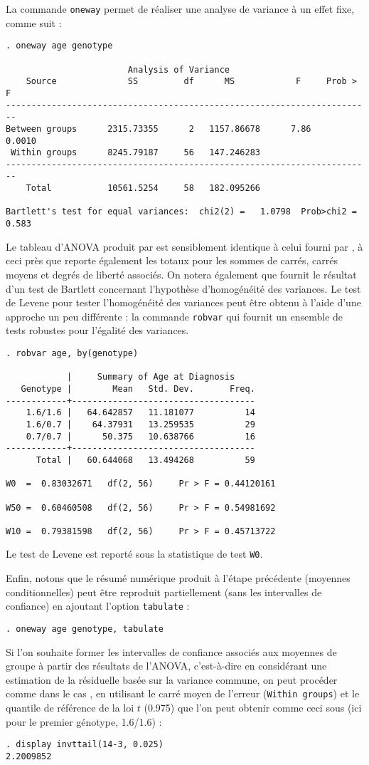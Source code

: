 La commande \texttt{oneway} permet de réaliser une analyse de variance à un
effet fixe, comme suit :
\begin{verbatim}
. oneway age genotype

                        Analysis of Variance
    Source              SS         df      MS            F     Prob > F
------------------------------------------------------------------------
Between groups      2315.73355      2   1157.86678      7.86     0.0010
 Within groups      8245.79187     56   147.246283
------------------------------------------------------------------------
    Total           10561.5254     58   182.095266

Bartlett's test for equal variances:  chi2(2) =   1.0798  Prob>chi2 = 0.583
\end{verbatim}
Le tableau d'ANOVA produit par \Stata est sensiblement identique à celui
fourni par \R, à ceci près que \Stata reporte également les totaux pour les
sommes de carrés, carrés moyens et degrés de liberté associés. On notera
également que \Stata fournit le résultat d'un test de Bartlett concernant
l'hypothèse d'homogénéité des variances. Le test de Levene pour tester
l'homogénéité des variances peut être obtenu à l'aide d'une approche un peu
différente : la commande \verb|robvar| qui fournit un ensemble de tests
robustes pour l'égalité des variances.
\begin{verbatim}
. robvar age, by(genotype)

            |     Summary of Age at Diagnosis
   Genotype |        Mean   Std. Dev.       Freq.
------------+------------------------------------
    1.6/1.6 |   64.642857   11.181077          14
    1.6/0.7 |    64.37931   13.259535          29
    0.7/0.7 |      50.375   10.638766          16
------------+------------------------------------
      Total |   60.644068   13.494268          59

W0  =  0.83032671   df(2, 56)     Pr > F = 0.44120161

W50 =  0.60460508   df(2, 56)     Pr > F = 0.54981692

W10 =  0.79381598   df(2, 56)     Pr > F = 0.45713722
\end{verbatim}
Le test de Levene est reporté sous la statistique de test \texttt{W0}.

Enfin, notons que le résumé numérique produit à l'étape précédente (moyennes
conditionnelles) peut être reproduit partiellement (sans les intervalles de
confiance) en ajoutant l'option \texttt{tabulate} :
\begin{verbatim}
. oneway age genotype, tabulate
\end{verbatim}
Si l'on souhaite former les intervalles de confiance associés aux moyennes
de groupe à partir des résultats de l'ANOVA, c'est-à-dire en considérant une
estimation de la résiduelle basée sur la variance commune, on peut procéder
comme dans le cas \R, en utilisant le carré moyen de l'erreur
(\texttt{Within groups}) et le quantile de référence de la loi $t$ (0.975)
que l'on peut obtenir comme ceci sous \Stata (ici pour le premier génotype,
1.6/1.6) :
\begin{verbatim}
. display invttail(14-3, 0.025)
2.2009852
\end{verbatim}

